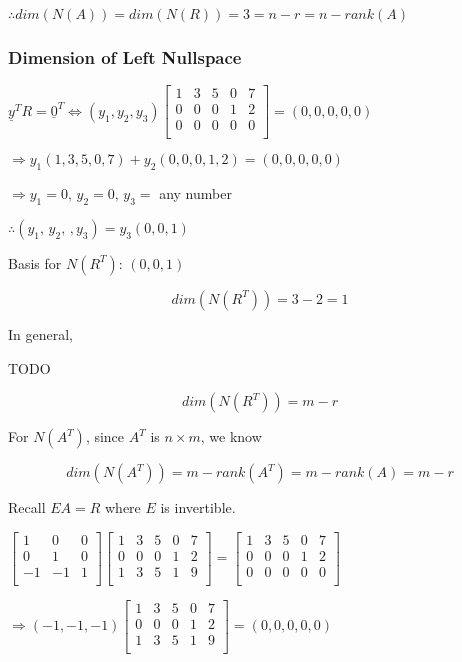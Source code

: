 \documentclass[12pt,a4paper]{article}
\begin{document}
$\therefore dim(N(A)) = dim(N(R)) = 3 = n - r = n - rank(A)$

\subsubsection*{Dimension of Left Nullspace}

$\underline{y}^TR = \underline{0}^T \iff 
(y_1, y_2, y_3)
\begin{bmatrix}
  1 & 3 & 5 & 0 & 7 \\
  0 & 0 & 0 & 1 & 2 \\
  0 & 0 & 0 & 0 & 0 \\
\end{bmatrix} = 
(0, 0, 0, 0, 0)
$

$\Rightarrow y_1(1,3,5,0,7) + y_2(0,0,0,1,2) = (0,0,0,0,0)$

$\Rightarrow y_1 = 0,\, y_2 = 0,\, y_3 = $ any number

$\therefore (y_1,\, y_2,\,, y_3) = y_3(0,0,1)$

Basis for $N(R^T)$: $(0,0,1)$

\[dim(N(R^T)) = 3 - 2 = 1\]

In general,

TODO

\[dim(N(R^T)) = m - r\]

For $N(A^T)$, since $A^T$ is $n \times m$, we know

\[dim(N(A^T)) = m - rank(A^T) = m - rank(A) = m - r\]

Recall $EA = R$ where $E$ is invertible.

$ 
\begin{bmatrix}
  1 & 0 & 0 \\
  0 & 1 & 0 \\
  -1 & -1 & 1 \\
\end{bmatrix}
\begin{bmatrix}
  1 & 3 & 5 & 0 & 7 \\
  0 & 0 & 0 & 1 & 2 \\
  1 & 3 & 5 & 1 & 9 \\
\end{bmatrix}
= 
\begin{bmatrix}
  \boxed{1} & 3 & 5 & 0 & 7 \\
  0 & 0 & 0 & \boxed{1} & 2 \\
  0 & 0 & 0 & 0 & 0 \\
\end{bmatrix}
$

$
\Rightarrow
(-1, -1, -1)
\begin{bmatrix}
  1 & 3 & 5 & 0 & 7 \\
  0 & 0 & 0 & 1 & 2 \\
  1 & 3 & 5 & 1 & 9 \\
\end{bmatrix} = (0,0,0,0,0)
$
\end{document}
